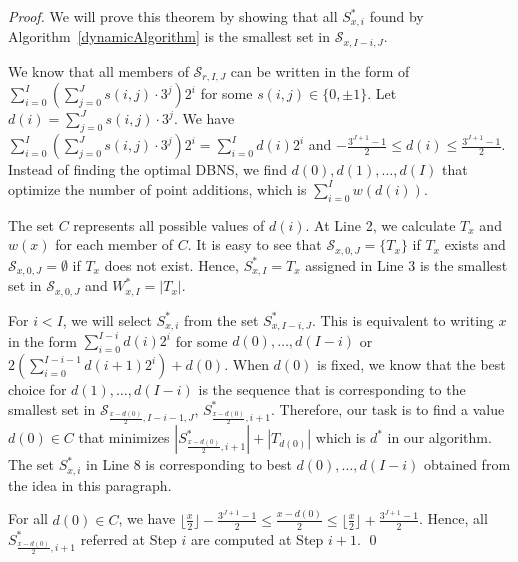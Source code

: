 \begin{proof}
We will prove this theorem by showing that all $S^*_{x,i}$ found by Algorithm~\ref{dynamicAlgorithm} is the smallest set in $\mathcal{S}_{x, I - i, J}$.

We know that all members of $\mathcal{S}_{r, I, J}$ can be written in the form of $\sum\limits_{i = 0}^I \left(\sum\limits_{j = 0}^J s(i,j) \cdot 3^j\right) 2^i$
for some $s(i,j) \in \{0, \pm 1\}$. Let $d(i) = \sum\limits_{j = 0}^J s(i,j) \cdot 3^j$.
We have $\sum\limits_{i = 0}^I \left(\sum\limits_{j = 0}^J s(i,j) \cdot 3^j\right) 2^i = \sum\limits_{i = 0}^I d(i) 2^i$
and  $-\frac{3^{J + 1} - 1}{2} \leq d(i) \leq \frac{3^{J + 1} - 1}{2}$.
Instead of finding the optimal DBNS, we find $d(0), d(1), \dots, d(I)$ that optimize the number of point additions, which is $\sum_{i = 0}^I w(d(i))$.

The set $C$ represents all possible values of $d(i)$.
At Line 2, we calculate $T_x$ and $w(x)$ for each member of $C$.
It is easy to see that $\mathcal{S}_{x, 0, J} = \{T_x\}$ if $T_x$ exists
and $\mathcal{S}_{x, 0, J} = \emptyset$ if $T_x$ does not exist.
Hence, $S_{x, I}^* = T_x$ assigned in Line 3 is the smallest set in $\mathcal{S}_{x, 0, J}$  and $W_{x, I}^* = |T_x|$.

For $i < I$, we will select $S^*_{x,i}$ from the set $S^*_{x, I - i, J}$.
This is equivalent to writing $x$ in the form $\sum_{i = 0}^{I - i} d(i) 2^i$
for some $d(0), \dots, d(I - i)$ or $2 \left( \sum_{i = 0}^{I - i - 1} d(i + 1) 2^i \right) + d(0)$.
When $d(0)$ is fixed, we know that the best choice for $d(1), \dots, d(I - i)$ is the sequence that is corresponding to the smallest set in
$\mathcal{S}_{\frac{x - d(0)}{2}, I - i - 1, J}$, $S^*_{\frac{x - d(0)}{2}, i + 1}$.
Therefore, our task is to find a value $d(0) \in C$ that minimizes $\left|S^*_{\frac{x - d(0)}{2}, i + 1}\right| + \left|T_{d(0)}\right|$ which is $d^*$ in our algorithm.
The set $S^*_{x,i}$ in Line 8 is corresponding to best $d(0), \dots, d(I - i)$ obtained from the idea in this paragraph.

For all $d(0) \in C$, we have $\lfloor \frac{x}{2} \rfloor - \frac{3^{J + 1} - 1}{2} \leq \frac{x - d(0)}{2} \leq \lfloor \frac{x}{2} \rfloor + \frac{3^{J + 1} - 1}{2}$.
Hence, all $S^*_{\frac{x - d(0)}{2}, i + 1}$ referred at Step $i$ are computed at Step $i + 1$. \qed
\end{proof}  

